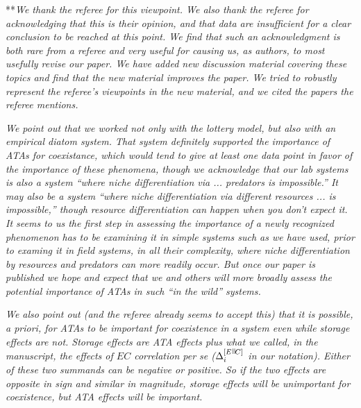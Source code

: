 \documentclass[letterpaper,11pt]{article}
\newcommand{\nat}{%
\text{\hspace{-1.5pt}
\begin{tikzpicture}[scale=1.8]%
\draw (.333ex,0) -- (.333ex,1ex);%
\draw (.666ex,0) -- (.666ex,1ex);
\end{tikzpicture}%
}}
\begin{document}
\noindent ***\emph{We thank the referee for this viewpoint. We also thank the referee for acknowledging that this
is their opinion, and that data are insufficient for a clear conclusion to be reached at this point. We find that 
such an acknowledgment is both rare from a referee and very useful for causing us, as authors, to most usefully revise our 
paper. We have added new discussion material covering these topics and find that the new material improves the paper.
We tried to robustly represent the referee's viewpoints in the new material, and we cited the papers the referee mentions.}

\emph{We point out that we worked not only
with the lottery model, but also with an empirical diatom system. That system definitely supported the importance of 
ATAs for coexistance, which would tend to give at least one data point in favor of the importance of these phenomena, though we 
acknowledge that our lab systems is also a system ``where niche differentiation via ... predators is impossible.''
It may also be a system ``where niche differentiation via different resources ... is impossible,'' though resource 
differentiation can happen when you don't expect it. It seems to us 
the first step in assessing the importance of a newly recognized phenomenon has to be examining it in simple systems
such as we have used, prior to examing it in field systems, in all their complexity, where niche differentiation
by resources and predators can more readily occur. But once our paper is published we hope and expect that we and
others will more broadly assess the potential importance of ATAs in such ``in the wild'' systems.}

\emph{We also point
out (and the referee already seems to accept this) that it is possible, \emph{a priori}, for ATAs to be 
important for coexistence in a system even while storage effects are not.
Storage effects are ATA effects plus what we called, in the manuscript, the effects of $EC$ correlation \emph{per se} 
($\Delta_i^{[E \nat C]}$ in our notation). Either of these two summands can be negative or positive.
So if the two effects are opposite in sign and similar in magnitude, storage effects will be unimportant for 
coexistence, but ATA effects will be important.}
\end{document}
